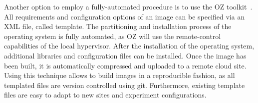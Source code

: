 Another option to employ a fully-automated procedure is to use the OZ toolkit~\cite{OZ}. All requirements and configuration options of an image can be specified via an XML file, called template. The partitioning and installation process of the operating system is fully automated, as OZ will use the remote-control capabilities of the local hypervisor. After the installation of the operating system, additional libraries and configuration files can be installed. Once the image has been built, it is automatically compressed and uploaded to a remote cloud site.
Using this technique allows to build images in a reproducible fashion, as all templated files are version controlled using git. Furthermore, existing template files are easy to adapt to new sites and experiment configurations.